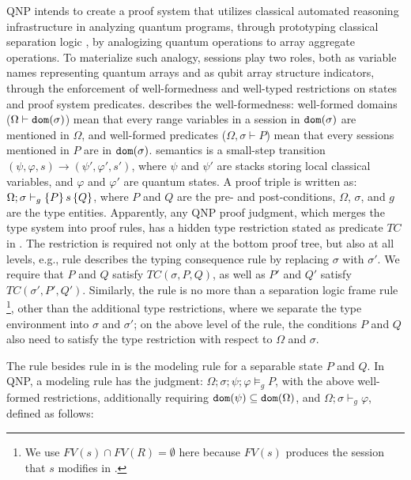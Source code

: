 QNP intends to create a proof system that utilizes classical automated reasoning infrastructure in analyzing quantum programs, through prototyping classical separation logic \cite{separationlogic}, by analogizing quantum operations to array aggregate operations.
To materialize such analogy, \qafny sessions play two roles, both as variable names representing quantum arrays and as qubit array structure indicators, through the enforcement of well-formedness and well-typed restrictions on states and proof system predicates.
 describes the well-formedness: well-formed domains ($\Omega\vdash \mathtt{dom}(\sigma)$) mean that every range variables in a session in $\mathtt{dom}(\sigma)$ are mentioned in $\Omega$, and well-formed predicates ($\Omega,\sigma \vdash P$) mean that every sessions mentioned in $P$ are in $\mathtt{dom}(\sigma)$.
\qafny semantics is a small-step transition $(\psi,\varphi,s) \longrightarrow (\psi',\varphi',s')$, where $\psi$ and $\psi'$ are stacks storing local classical variables, and $\varphi$ and $\varphi'$ are quantum states. A \qafny proof triple is written as: $\Omega;\sigma\vdash_{g}\{P\}\, s \,\{Q\}$, where $P$ and $Q$ are the pre- and post-conditions, $\Omega$, $\sigma$, and $g$ are the type entities. Apparently, any QNP proof judgment, which merges the \qafny type system into proof rules, has a hidden type restriction stated as predicate $TC$ in .
The restriction is required not only at the bottom proof tree, but also at all levels, e.g., rule  describes the typing consequence rule by replacing $\sigma$ with $\sigma'$. We require that $P$ and $Q$ satisfy $TC(\sigma,P,Q)$, as well as $P'$ and $Q'$ satisfy $TC(\sigma',P',Q')$.
Similarly, the  rule is no more than a separation logic frame rule \footnote{We use $FV(s)\cap FV(R)=\emptyset$ here because $FV(s)$ produces the session that $s$ modifies in \qafny. }, other than the additional type restrictions, where we separate the type environment into $\sigma$ and $\sigma'$; on the above level of the  rule, the conditions $P$ and $Q$ also need to satisfy the type restriction with respect to $\Omega$ and $\sigma$.

The rule besides rule  in  is the modeling rule for a separable state $P$ and $Q$.
In QNP, a modeling rule has the judgment: $\Omega;\sigma;\psi;\varphi\models_g P$, with the above well-formed restrictions, additionally requiring $\mathtt{dom}(\psi) \subseteq \mathtt{dom}(\Omega)$, and $\Omega;\sigma\vdash_g \varphi$, defined as follows:

